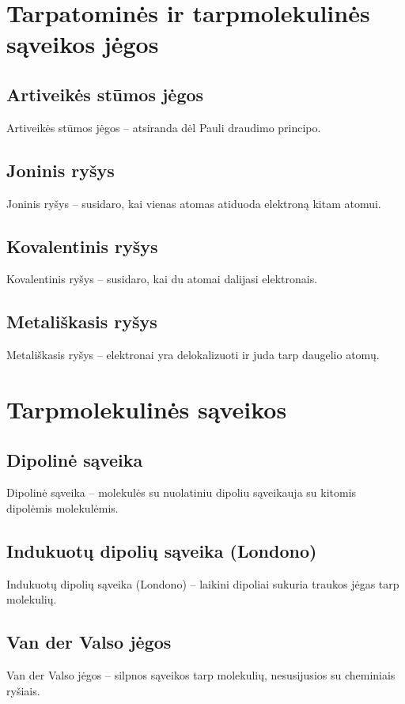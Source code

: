 \documentclass[a4paper,12pt]{article}
\begin{document}
\section{Tarpatominės ir tarpmolekulinės sąveikos jėgos}

\subsection{Artiveikės stūmos jėgos}
Artiveikės stūmos jėgos – atsiranda dėl Pauli draudimo principo.

\subsection{Joninis ryšys}
Joninis ryšys – susidaro, kai vienas atomas atiduoda elektroną kitam atomui.

\subsection{Kovalentinis ryšys}
Kovalentinis ryšys – susidaro, kai du atomai dalijasi elektronais.

\subsection{Metališkasis ryšys}
Metališkasis ryšys – elektronai yra delokalizuoti ir juda tarp daugelio atomų.

\section{Tarpmolekulinės sąveikos}

\subsection{Dipolinė sąveika}
Dipolinė sąveika – molekulės su nuolatiniu dipoliu sąveikauja su kitomis dipolėmis molekulėmis.

\subsection{Indukuotų dipolių sąveika (Londono)}
Indukuotų dipolių sąveika (Londono) – laikini dipoliai sukuria traukos jėgas tarp molekulių.

\subsection{Van der Valso jėgos}
Van der Valso jėgos – silpnos sąveikos tarp molekulių, nesusijusios su cheminiais ryšiais.
\end{document}
